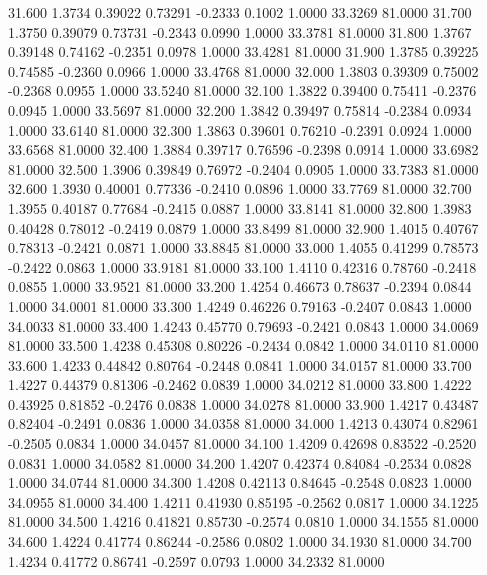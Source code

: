   31.600   1.3734   0.39022   0.73291  -0.2333   0.1002   1.0000  33.3269  81.0000
  31.700   1.3750   0.39079   0.73731  -0.2343   0.0990   1.0000  33.3781  81.0000
  31.800   1.3767   0.39148   0.74162  -0.2351   0.0978   1.0000  33.4281  81.0000
  31.900   1.3785   0.39225   0.74585  -0.2360   0.0966   1.0000  33.4768  81.0000
  32.000   1.3803   0.39309   0.75002  -0.2368   0.0955   1.0000  33.5240  81.0000
  32.100   1.3822   0.39400   0.75411  -0.2376   0.0945   1.0000  33.5697  81.0000
  32.200   1.3842   0.39497   0.75814  -0.2384   0.0934   1.0000  33.6140  81.0000
  32.300   1.3863   0.39601   0.76210  -0.2391   0.0924   1.0000  33.6568  81.0000
  32.400   1.3884   0.39717   0.76596  -0.2398   0.0914   1.0000  33.6982  81.0000
  32.500   1.3906   0.39849   0.76972  -0.2404   0.0905   1.0000  33.7383  81.0000
  32.600   1.3930   0.40001   0.77336  -0.2410   0.0896   1.0000  33.7769  81.0000
  32.700   1.3955   0.40187   0.77684  -0.2415   0.0887   1.0000  33.8141  81.0000
  32.800   1.3983   0.40428   0.78012  -0.2419   0.0879   1.0000  33.8499  81.0000
  32.900   1.4015   0.40767   0.78313  -0.2421   0.0871   1.0000  33.8845  81.0000
  33.000   1.4055   0.41299   0.78573  -0.2422   0.0863   1.0000  33.9181  81.0000
  33.100   1.4110   0.42316   0.78760  -0.2418   0.0855   1.0000  33.9521  81.0000
  33.200   1.4254   0.46673   0.78637  -0.2394   0.0844   1.0000  34.0001  81.0000
  33.300   1.4249   0.46226   0.79163  -0.2407   0.0843   1.0000  34.0033  81.0000
  33.400   1.4243   0.45770   0.79693  -0.2421   0.0843   1.0000  34.0069  81.0000
  33.500   1.4238   0.45308   0.80226  -0.2434   0.0842   1.0000  34.0110  81.0000
  33.600   1.4233   0.44842   0.80764  -0.2448   0.0841   1.0000  34.0157  81.0000
  33.700   1.4227   0.44379   0.81306  -0.2462   0.0839   1.0000  34.0212  81.0000
  33.800   1.4222   0.43925   0.81852  -0.2476   0.0838   1.0000  34.0278  81.0000
  33.900   1.4217   0.43487   0.82404  -0.2491   0.0836   1.0000  34.0358  81.0000
  34.000   1.4213   0.43074   0.82961  -0.2505   0.0834   1.0000  34.0457  81.0000
  34.100   1.4209   0.42698   0.83522  -0.2520   0.0831   1.0000  34.0582  81.0000
  34.200   1.4207   0.42374   0.84084  -0.2534   0.0828   1.0000  34.0744  81.0000
  34.300   1.4208   0.42113   0.84645  -0.2548   0.0823   1.0000  34.0955  81.0000
  34.400   1.4211   0.41930   0.85195  -0.2562   0.0817   1.0000  34.1225  81.0000
  34.500   1.4216   0.41821   0.85730  -0.2574   0.0810   1.0000  34.1555  81.0000
  34.600   1.4224   0.41774   0.86244  -0.2586   0.0802   1.0000  34.1930  81.0000
  34.700   1.4234   0.41772   0.86741  -0.2597   0.0793   1.0000  34.2332  81.0000
